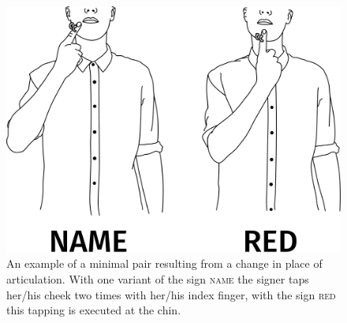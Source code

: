 \begin{figure}[bt]
\centering
	\includegraphics[width=1.0\textwidth]{minimalpair2.jpg}
	\caption{An example of a minimal pair resulting from a change in place of articulation. With one variant of the sign \textsc{name} the signer taps her/his cheek two times with her/his index finger, with the sign \textsc{red} this tapping is executed at the chin.}
	\label{minimalpairtwo}
\end{figure}

